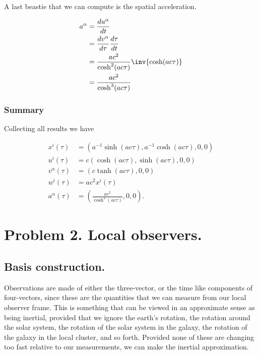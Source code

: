 A last beastie that we can compute is the spatial acceleration.

\begin{align*}
a^\alpha 
&= \frac{du^\alpha}{dt} \\
&= \frac{dv^\alpha}{d\tau} \frac{d \tau}{dt} \\
&= \frac{a c^2}{\cosh^2(a c \tau)} \inv{\cosh(a c \tau) } \\
&= \frac{a c^2}{\cosh^3(a c \tau)} \\
\end{align*}

\subsubsection{Summary}

Collecting all results we have

\begin{align}\label{eqn:relativisticElectrodynamicsT2:150}
x^i(\tau) &= \left( a^{-1} \sinh( a c \tau), a^{-1} \cosh( a c \tau ), 0, 0 \right) \\
u^i(\tau) &= c \left( \cosh( a c \tau ), \sinh( a c \tau ), 0, 0\right) \\
v^\alpha(\tau) &= \left( c \tanh(a c \tau), 0, 0 \right) \\
w^i(\tau) &= a c^2 x^i(\tau) \\
a^\alpha(\tau) &= \left( \frac{a c^2}{\cosh^3 (a c \tau)}, 0, 0 \right).
\end{align}

\section{Problem 2.  Local observers.}

\subsection{Basis construction.}

Observations are made of either the three-vector, or the time like components of four-vectors, since these are the quantities that we can measure from our local observer frame.  This is something that can be viewed in an approximate sense as being inertial, provided that we ignore the earth's rotation, the rotation around the solar system, the rotation of the solar system in the galaxy, the rotation of the galaxy in the local cluster, and so forth.  Provided none of these are changing too fast relative to our measurements, we can make the inertial approximation.


